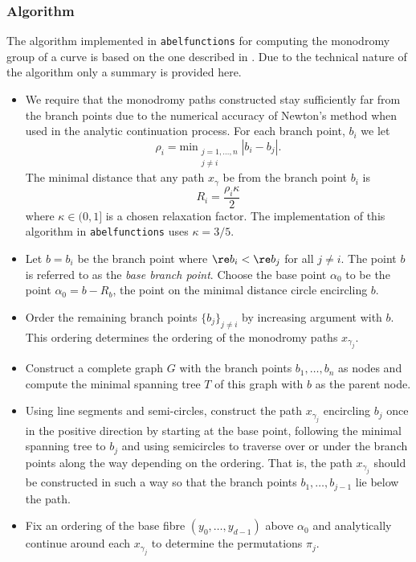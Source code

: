 %
\subsubsection*{Algorithm}
%

The algorithm implemented in {\tt abelfunctions} for computing the
monodromy group of a curve is based on the one described in
\cite{FKS12}. Due to the technical nature of the algorithm only a
summary is provided here.

\begin{itemize}
  \item We require that the monodromy paths constructed stay
    sufficiently far from the branch points due to the numerical
    accuracy of Newton's method when used in the analytic continuation
    process. For each branch point, $b_i$ we let
    \[
        \rho_i =
        \text{min}_{\substack{j=1,\ldots,n \\ j\neq i}} |b_i - b_j|.
    \]
    The minimal distance that any path $x_\gamma$ be from the branch
    point $b_i$ is
    \[
        R_i = \frac{\rho_i \kappa}{2}
    \]
    where $\kappa \in (0,1]$ is a chosen relaxation factor. The
      implementation of this algorithm in {\tt abelfunctions} uses
      $\kappa = 3/5$.
  \item Let $b = b_i$ be the branch point where $\re b_i < \re b_j$ for
    all $j \neq i$. The point $b$ is referred to as the {\it base branch
      point}. Choose the base point $\alpha_0$ to be the point $\alpha_0
    = b - R_b$, the point on the minimal distance circle encircling $b$.
  \item Order the remaining branch points $\{b_j\}_{j \neq i}$ by
    increasing argument with $b$. This ordering determines the ordering
    of the monodromy paths $x_{\gamma_j}$.
  \item Construct a complete graph $G$ with the branch points
    $b_1,\ldots,b_n$ as nodes and compute the minimal spanning tree $T$
    of this graph with $b$ as the parent node.
  \item Using line segments and semi-circles, construct the path
    $x_{\gamma_j}$ encircling $b_j$ once in the positive direction by
    starting at the base point, following the minimal spanning tree to
    $b_j$ and using semicircles to traverse over or under the branch
    points along the way depending on the ordering. That is, the path
    $x_{\gamma_j}$ should be constructed in such a way so that the
    branch points $b_1,\ldots,b_{j-1}$ lie below the path.
  \item Fix an ordering of the base fibre $(y_0,\ldots,y_{d-1})$ above
    $\alpha_0$ and analytically continue around each $x_{\gamma_j}$ to
    determine the permutations $\pi_j$.
\end{itemize}

